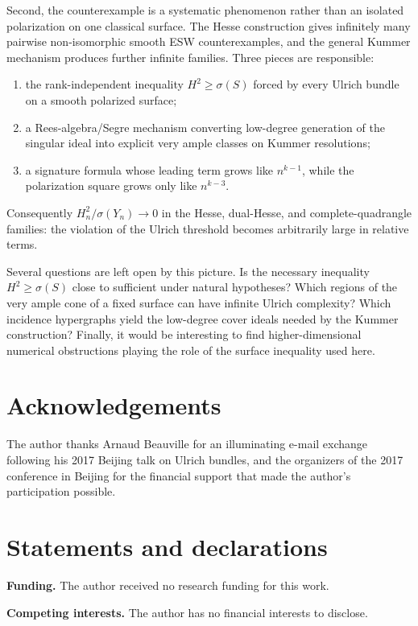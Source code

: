 \documentclass[11pt]{article}
\newcommand{\sig}{\sigma}
\begin{document}
Second, the counterexample is a systematic phenomenon rather than an isolated
polarization on one classical surface.  The Hesse construction gives infinitely many
pairwise non-isomorphic smooth ESW counterexamples, and the general Kummer mechanism
produces further infinite families.  Three pieces are responsible:
\begin{enumerate}
\item the rank-independent inequality $H^2\ge\sig(S)$ forced by every Ulrich bundle
      on a smooth polarized surface;
\item a Rees-algebra/Segre mechanism converting low-degree generation of the singular
      ideal into explicit very ample classes on Kummer resolutions;
\item a signature formula whose leading term grows like $n^{k-1}$, while the
      polarization square grows only like $n^{k-3}$.
\end{enumerate}
Consequently $H_n^2/\sig(Y_n)\to0$ in the Hesse, dual-Hesse, and complete-quadrangle
families: the violation of the Ulrich threshold becomes arbitrarily large in relative
terms.

Several questions are left open by this picture.  Is the necessary inequality
$H^2\ge\sig(S)$ close to sufficient under natural hypotheses?  Which regions of the
very ample cone of a fixed surface can have infinite Ulrich complexity?  Which
incidence hypergraphs yield the low-degree cover ideals needed by the Kummer
construction?  Finally, it would be interesting to find higher-dimensional numerical
obstructions playing the role of the surface inequality used here.

\section*{Acknowledgements}
The author thanks Arnaud Beauville for an illuminating e-mail exchange following his 2017 Beijing talk on Ulrich bundles, and the organizers of the 2017 conference in Beijing for the financial support that made the author's participation possible.

\section*{Statements and declarations}
\noindent\textbf{Funding.}
The author received no research funding for this work.

\medskip
\noindent\textbf{Competing interests.}
The author has no financial interests to disclose.
\end{document}
